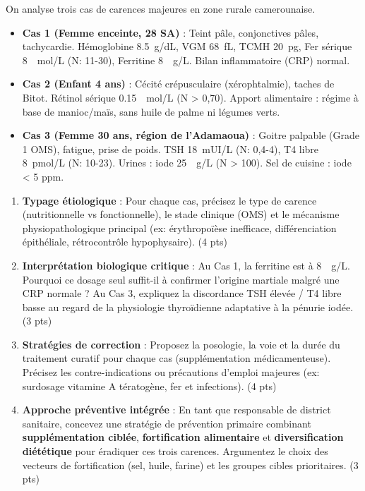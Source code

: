 \documentclass[11pt]{article}
\begin{document}
\begin{exercice}
On analyse trois cas de carences majeures en zone rurale camerounaise.
\begin{itemize}
    \item \textbf{Cas 1 (Femme enceinte, 28 SA)} : Teint pâle, conjonctives pâles, tachycardie. Hémoglobine \SI{8,5}{g/dL}, VGM \SI{68}{fL}, TCMH \SI{20}{pg}, Fer sérique \SI{8}{\mu mol/L} (N: 11-30), Ferritine \SI{8}{\mu g/L}. Bilan inflammatoire (CRP) normal.
    \item \textbf{Cas 2 (Enfant 4 ans)} : Cécité crépusculaire (xérophtalmie), taches de Bitot. Rétinol sérique \SI{0,15}{\mu mol/L} (N > 0,70). Apport alimentaire : régime à base de manioc/maïs, sans huile de palme ni légumes verts.
    \item \textbf{Cas 3 (Femme 30 ans, région de l'Adamaoua)} : Goitre palpable (Grade 1 OMS), fatigue, prise de poids. TSH \SI{18}{mUI/L} (N: 0,4-4), T4 libre \SI{8}{pmol/L} (N: 10-23). Urines : iode \SI{25}{\mu g/L} (N > 100). Sel de cuisine : iode < 5 ppm.
\end{itemize}

\begin{enumerate}
    \item \textbf{Typage étiologique} : Pour chaque cas, précisez le type de carence (nutritionnelle vs fonctionnelle), le stade clinique (OMS) et le mécanisme physiopathologique principal (ex: érythropoïèse inefficace, différenciation épithéliale, rétrocontrôle hypophysaire). \hfill (4 pts)
    \item \textbf{Interprétation biologique critique} : Au Cas 1, la ferritine est à \SI{8}{\mu g/L}. Pourquoi ce dosage seul suffit-il à confirmer l'origine martiale malgré une CRP normale ? Au Cas 3, expliquez la discordance TSH élevée / T4 libre basse au regard de la physiologie thyroïdienne adaptative à la pénurie iodée. \hfill (3 pts)
    \item \textbf{Stratégies de correction} : Proposez la posologie, la voie et la durée du traitement curatif pour chaque cas (supplémentation médicamenteuse). Précisez les contre-indications ou précautions d'emploi majeures (ex: surdosage vitamine A tératogène, fer et infections). \hfill (4 pts)
    \item \textbf{Approche préventive intégrée} : En tant que responsable de district sanitaire, concevez une stratégie de prévention primaire combinant \textbf{supplémentation ciblée}, \textbf{fortification alimentaire} et \textbf{diversification diététique} pour éradiquer ces trois carences. Argumentez le choix des vecteurs de fortification (sel, huile, farine) et les groupes cibles prioritaires. \hfill (3 pts)
\end{enumerate}
\end{exercice}
\end{document}
